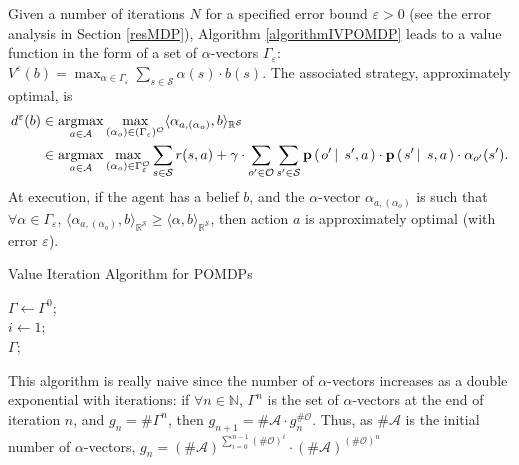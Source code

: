 Given a number of iterations $N$ 
for a specified error bound $\varepsilon>0$ 
(see the error analysis in Section \ref{resMDP}), 
Algorithm \ref{algorithmIVPOMDP}
leads to a value function in the form of a set of $\alpha$-vectors $\Gamma_{\varepsilon}$:
$V^{\varepsilon}(b) = \max_{\alpha \in \Gamma_{\varepsilon}} \sum_{s \in \mathcal{S}} \alpha(s) \cdot b(s)$.
The associated strategy, approximately optimal, is 
\begin{align*}
 d^{\varepsilon}(b) & \in \operatorname*{argmax}_{a \in \mathcal{A}} \max_{ (\alpha_o) \in (\Gamma_{\varepsilon})^{\mathcal{O}}} \langle \alpha_{a,(\alpha_o)}, b \rangle_{\mathbb{R}^{\mathcal{S}}} \\
& \in \operatorname*{argmax}_{a \in \mathcal{A}} \max_{ (\alpha_o) \in \Gamma_{\varepsilon}^{\mathcal{O}}} \sum_{s \in \mathcal{S}} r(s,a) + \gamma \cdot \sum_{o' \in \mathcal{O}} \sum_{s' \in \mathcal{S}} \textbf{p} \left( \left. o' \, \right| \left. \, s',a \right. \right) \cdot \textbf{p} \left( \left.  s' \, \right| \left. \, s ,a   \right. \right) \cdot \alpha_{o'}(s').
\end{align*}
At execution, if the agent has a belief $b$,
and the $\alpha$-vector $\alpha_{a,(\alpha_o)}$ 
is such that $\forall \alpha \in \Gamma_{\varepsilon}$, $\langle \alpha_{a,(\alpha_o)}, b \rangle_{\mathbb{R}^{\mathcal{S}}} \geqslant \langle \alpha , b \rangle_{\mathbb{R}^{\mathcal{S}}}$,
then action $a$ is approximately optimal (with error $\varepsilon$).

\begin{algorithm} \caption{Value Iteration Algorithm for POMDPs} 
\label{algorithmIVPOMDP}
$\Gamma \gets \Gamma^0$; \\
$i \gets 1$; \\
\Return $\Gamma$;
\end{algorithm}

This algorithm is really naive since the number of $\alpha$-vectors 
increases as a double exponential with iterations: if $\forall n \in \mathbb{N}$, 
$\Gamma^n$ is the set of $\alpha$-vectors 
at the end of iteration $n$, and $g_n = \# \Gamma^n$, 
then $g_{n+1}=\# \mathcal{A} \cdot g_{n}^{\#\mathcal{O}}$. 
Thus, as $\# \mathcal{A}$ is the initial number of $\alpha$-vectors,
$g_n = (\# \mathcal{A})^{\sum_{i=0}^{n-1} (\# \mathcal{O})^i} \cdot (\# \mathcal{A})^{(\# \mathcal{O})^n}$

